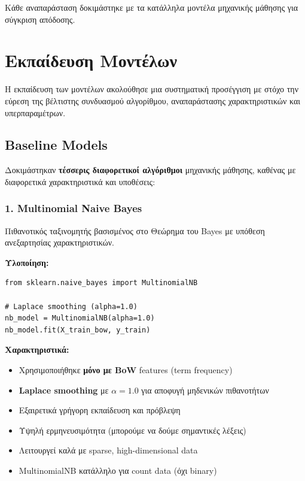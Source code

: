\documentclass[12pt,a4paper,twoside]{book}
\begin{document}
Κάθε αναπαράσταση δοκιμάστηκε με τα κατάλληλα μοντέλα μηχανικής μάθησης για σύγκριση απόδοσης.

\section{Εκπαίδευση Μοντέλων}

Η εκπαίδευση των μοντέλων ακολούθησε μια συστηματική προσέγγιση με στόχο την εύρεση της βέλτιστης συνδυασμού αλγορίθμου, αναπαράστασης χαρακτηριστικών και υπερπαραμέτρων.

\subsection{Baseline Models}

Δοκιμάστηκαν \textbf{τέσσερις διαφορετικοί αλγόριθμοι} μηχανικής μάθησης, καθένας με διαφορετικά χαρακτηριστικά και υποθέσεις:

\subsubsection*{1. Multinomial Naive Bayes}

Πιθανοτικός ταξινομητής βασισμένος στο Θεώρημα του Bayes με υπόθεση ανεξαρτησίας χαρακτηριστικών.

\textbf{Υλοποίηση:}
\begin{tcolorbox}[myCustomStyle={Multinomial Naive Bayes}]
    \begin{lstlisting}[style=myPythonStyle]
from sklearn.naive_bayes import MultinomialNB

# Laplace smoothing (alpha=1.0)
nb_model = MultinomialNB(alpha=1.0)
nb_model.fit(X_train_bow, y_train)
\end{lstlisting}
\end{tcolorbox}

\textbf{Χαρακτηριστικά:}
\begin{itemize}
    \item Χρησιμοποιήθηκε \textbf{μόνο με BoW} features (term frequency)
    \item \textbf{Laplace smoothing} με \(\alpha=1.0\) για αποφυγή μηδενικών πιθανοτήτων
    \item Εξαιρετικά γρήγορη εκπαίδευση και πρόβλεψη
    \item Υψηλή ερμηνευσιμότητα (μπορούμε να δούμε σημαντικές λέξεις)
    \item Λειτουργεί καλά με sparse, high-dimensional data
    \item MultinomialNB κατάλληλο για count data (όχι binary)
\end{itemize}
\end{document}
